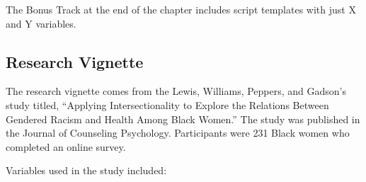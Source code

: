 \documentclass[
  11pt,
]{book}
\begin{document}
The Bonus Track at the end of the chapter includes script templates with just X and Y variables.

\hypertarget{research-vignette-6}{%
\subsection{Research Vignette}\label{research-vignette-6}}

The research vignette comes from the Lewis, Williams, Peppers, and Gadson's \citeyearpar{lewis_applying_2017} study titled, ``Applying Intersectionality to Explore the Relations Between Gendered Racism and Health Among Black Women.'' The study was published in the Journal of Counseling Psychology. Participants were 231 Black women who completed an online survey.

Variables used in the study included:
\end{document}
